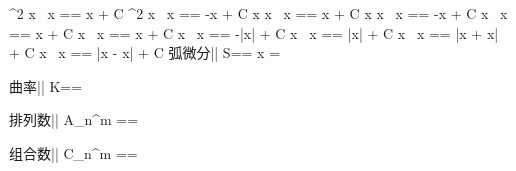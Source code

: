 \int \sec^2 x \, x == \tan x + C
\int \csc^2 x \, x == -\cot x + C
\int \sec x \tan x \, x == \sec x + C
\int \csc x \cot x \, x == -\csc x + C
\int \sinh x \, x == \cosh x + C
\int \cosh x \, x == \sinh x + C
\int \tan x \, x == -\ln|\cos x| + C
\int \cot x \, x == \ln|\sin x| + C
\int \sec x \, x == \ln|\sec x + \tan x| + C
\int \csc x \, x == \ln|\csc x - \cot x| + C
弧微分||
S==
x
= \theta

曲率||
K==


排列数||
A_n^m
== 


组合数||
C_n^m ==

